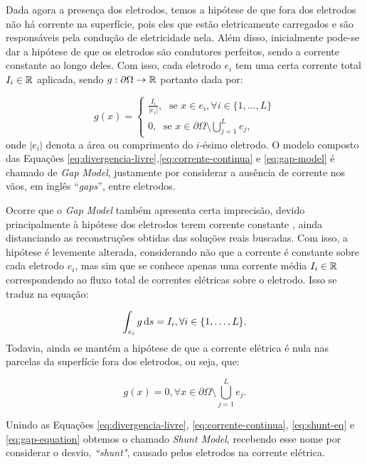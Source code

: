 Dada agora a presença dos eletrodos, temos a hipótese de que fora dos eletrodos não há corrente na superfície, pois eles que estão eletricamente carregados e são responsáveis pela condução de eletricidade nela. Além disso, inicialmente pode-se dar a hipótese de que os eletrodos são condutores perfeitos, sendo a corrente constante ao longo deles. Com isso, cada eletrodo $e_i$ tem uma certa corrente total $I_i\in \mathbb{R}$ aplicada, sendo $g: \partial \Omega \to \mathbb{R}$ portanto dada por:

\begin{equation}\label{eq:gap-model}
g(x) = \begin{cases}
    \frac{I_i}{|e_i|}, \; \text{ se } x\in e_i, \forall i\in\{1,\dots,L\}\\
    0, \; \text{ se } x \in \partial \Omega \setminus \bigcup_{j=1}^L e_j,
\end{cases}
\end{equation}
onde $|e_i|$ denota a área ou comprimento do $i$-ésimo eletrodo. O modelo composto das Equações \eqref{eq:divergencia-livre},\eqref{eq:corrente-continua} e \eqref{eq:gap-model} é chamado de \textit{Gap Model}, justamente por considerar a ausência de corrente nos vãos, em inglês ``\textit{gaps}'', entre eletrodos.

Ocorre que o \textit{Gap Model} também apresenta certa imprecisão, devido principalmente à hipótese dos eletrodos terem corrente constante \cite{somersalo}, ainda distanciando as reconstruções obtidas das soluções reais buscadas. Com isso, a hipótese é levemente alterada, considerando não que a corrente é constante sobre cada eletrodo $e_i$, mas sim que se conhece apenas uma corrente média $I_i\in \mathbb{R}$ correspondendo ao fluxo total de correntes elétricas sobre o eletrodo. Isso se traduz na equação:

\begin{equation}\label{eq:shunt-eq}
 \int_{e_i} g \mathop{}\!\mathrm{d} s = I_i, \forall i \in \{1,\dots, L\}.
\end{equation}
Todavia, ainda se mantém a hipótese de que a corrente elétrica é nula nas parcelas da superfície fora dos eletrodos, ou seja, que: 

\begin{equation}\label{eq:gap-equation}
    g(x) = 0, \forall x \in \partial \Omega \setminus \bigcup_{j=1}^L e_j.
\end{equation}

Unindo as Equações \eqref{eq:divergencia-livre}, \eqref{eq:corrente-continua}, \eqref{eq:shunt-eq} e \eqref{eq:gap-equation} obtemos o chamado \textit{Shunt Model}, recebendo esse nome por considerar o desvio, \textit{``shunt"}, causado pelos eletrodos na corrente elétrica.

